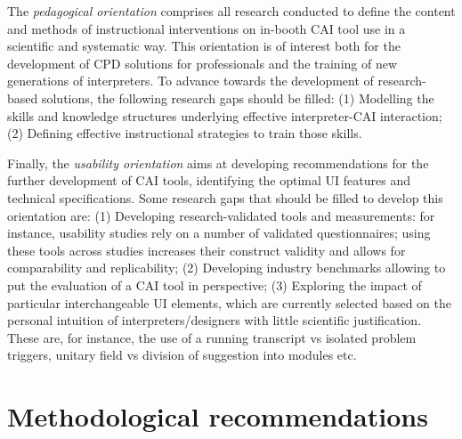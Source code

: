 The \textit{pedagogical orientation} comprises all research conducted to define the content and methods of instructional interventions on in-booth CAI tool use in a scientific and systematic way. This orientation is of interest both for the development of CPD solutions for professionals and the training of new generations of interpreters. To advance towards the development of research-based solutions, the following research gaps should be filled: (1) Modelling the skills and knowledge structures underlying effective interpreter-CAI interaction; (2) Defining effective instructional strategies to train those skills.

Finally, the \textit{usability orientation} aims at developing recommendations for the further development of CAI tools, identifying the optimal UI features and technical specifications. Some research gaps that should be filled to develop this orientation are: (1) Developing research-validated tools and measurements: for instance, usability studies rely on a number of validated questionnaires; using these tools across studies increases their construct validity and allows for comparability and replicability; (2) Developing industry benchmarks allowing to put the evaluation of a CAI tool in perspective; (3) Exploring the impact of particular interchangeable UI elements, which are currently selected based on the personal intuition of interpreters/designers with little scientific justification. These are, for instance, the use of a running transcript vs isolated problem triggers, unitary field vs division of suggestion into modules etc.


\section{Methodological recommendations}


